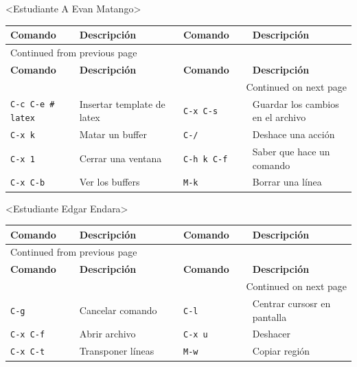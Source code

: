 \documentclass{article}
\begin{document}
<Estudiante A Evan Matango>
\begin{longtable}{|p{0.2\linewidth}|p{0.3\linewidth}|p{0.2\linewidth}|p{0.3\linewidth}|}
\textbf{Comando} & \textbf{Descripción} & \textbf{Comando} & \textbf{Descripción}\\[0pt]
\hline
\endfirsthead
\multicolumn{4}{l}{Continued from previous page} \\[0pt]
\hline

\textbf{Comando} & \textbf{Descripción} & \textbf{Comando} & \textbf{Descripción} \\[0pt]

\hline
\endhead
\hline\multicolumn{4}{r}{Continued on next page} \\
\endfoot
\endlastfoot
\hline
\texttt{C-c C-e \# latex} & Insertar template de  latex & \texttt{C-x C-s} & Guardar los cambios en el archivo\\[0pt]
\texttt{C-x k} & Matar un buffer & \texttt{C-/} & Deshace una acción\\[0pt]
\texttt{C-x 1} & Cerrar una ventana & \texttt{C-h k C-f} & Saber que hace un comando\\[0pt]
\texttt{C-x C-b} & Ver los buffers & \texttt{M-k} & Borrar una línea\\[0pt]
\end{longtable}

<Estudiante Edgar Endara>
\begin{longtable}{|p{0.2\linewidth}|p{0.3\linewidth}|p{0.2\linewidth}|p{0.3\linewidth}|}
\textbf{Comando} & \textbf{Descripción} & \textbf{Comando} & \textbf{Descripción}\\[0pt]
\hline
\endfirsthead
\multicolumn{4}{l}{Continued from previous page} \\[0pt]
\hline

\textbf{Comando} & \textbf{Descripción} & \textbf{Comando} & \textbf{Descripción} \\[0pt]

\hline
\endhead
\hline\multicolumn{4}{r}{Continued on next page} \\
\endfoot
\endlastfoot
\hline
\texttt{C-g} & Cancelar comando & \texttt{C-l} & Centrar cursosr en pantalla\\[0pt]
\texttt{C-x C-f} & Abrir archivo & \texttt{C-x u} & Deshacer\\[0pt]
\texttt{C-x C-t} & Transponer líneas & \texttt{M-w} & Copiar región\\[0pt]
\end{longtable}
\end{document}
